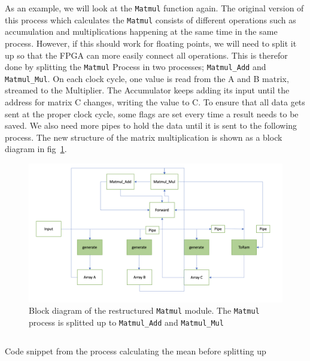 As an example, we will look at the \texttt{Matmul} function again. The original version of this process which calculates the \texttt{Matmul} consists of different operations such as accumulation and multiplications happening at the same time in the same process. However, if this should work for floating points, we will need to split it up so that the FPGA can more easily connect all operations.
This is therefor done by splitting the \texttt{Matmul} Process in two processes; \texttt{Matmul\_Add} and \texttt{Matmul\_Mul}.
On each clock cycle, one value is read from the A and B matrix, streamed to the Multiplier. The Accumulator keeps adding its input until the address for matrix C changes, writing the value to C. 
To ensure that all data gets sent at the proper clock cycle, some flags are set every time a result needs to be saved. We also need more pipes to hold the data until it is sent to the following process. The new structure of the matrix multiplication is shown as a block diagram in fig~\ref{fig:mm_diagram}. 




\begin{figure}
  \centering
  \includegraphics[width=0.8\linewidth]{Pictures/mm_blocks.png}
  \caption{Block diagram of the restructured \texttt{Matmul} module. The \texttt{Matmul} process is splitted up to \texttt{Matmul\_Add} and \texttt{Matmul\_Mul}}
  \label{fig:mm_diagram}
\end{figure}

\iffalse
\begin{listing}
  \inputminted{csharp}{codesnippets/mean_before.cs}
  \caption{Code snippet from the process calculating the mean before splitting up}
  \label{lst:mean_before}
\end{listing}


